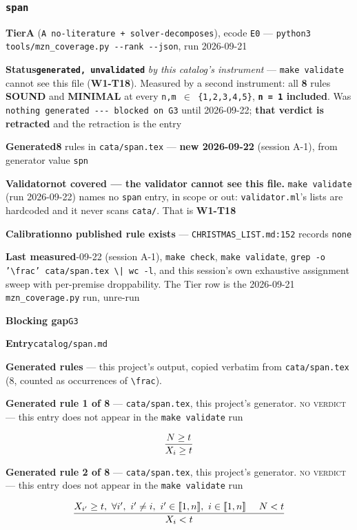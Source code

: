 \documentclass[10pt,a4paper]{article}
\newcommand{\entryfield}[2]{{\raggedright\textbf{#1}\quad #2\par}}
\newcommand{\rulebox}[1]{%
  \[\resizebox{\ifdim\width>\linewidth\linewidth\else\width\fi}{!}%
    {$\displaystyle #1$}\]}
\begin{document}
\subsubsection*{\texttt{span}}
\label{entry:span}
\entryfield{Tier}{\textbf{A} (\texttt{A no-\allowbreak{}literature + solver-\allowbreak{}decomposes}), ecode \texttt{E0} --- \texttt{python3 tools/\allowbreak{}mzn\_\allowbreak{}coverage.\allowbreak{}py -\allowbreak{}-\allowbreak{}rank -\allowbreak{}-\allowbreak{}json}, run 2026-09-21}
\entryfield{Status}{\textbf{\texttt{generated, unvalidated}} \emph{by this catalog's instrument} --- \texttt{make validate} cannot see this file (\textbf{W1-T18}). Measured by a second instrument: all \textbf{8} rules \textbf{SOUND} and \textbf{MINIMAL} at every \texttt{n,m $\in$ \{1,2,3,4,5\}}, \textbf{\texttt{n = 1} included}. Was \texttt{nothing generated -\allowbreak{}-\allowbreak{}-\allowbreak{} blocked on G3} until 2026-09-22; \textbf{that verdict is retracted} and the retraction is the entry}
\entryfield{Generated}{\textbf{8} rules in \texttt{cata/span.tex} --- \textbf{new 2026-09-22} (session A-1), from generator value \texttt{spn}}
\entryfield{Validator}{\textbf{not covered --- the validator cannot see this file.} \texttt{make validate} (run 2026-09-22) names no \texttt{span} entry, in scope or out: \texttt{validator.ml}'s lists are hardcoded and it never scans \texttt{cata/}. That is \textbf{W1-T18}}
\entryfield{Calibration}{\textbf{no published rule exists} --- \texttt{CHRISTMAS\_LIST.md:152} records \texttt{none}}
\entryfield{Last measured}{2026-09-22 (session A-1), \texttt{make check}, \texttt{make validate}, \texttt{grep -\allowbreak{}o '\textbackslash{}frac' cata/\allowbreak{}span.\allowbreak{}tex \textbackslash{}| wc -\allowbreak{}l}, and this session's own exhaustive assignment sweep with per-premise droppability. The Tier row is the 2026-09-21 \texttt{mzn\_coverage.py} run, unre-run}
\entryfield{Blocking gap}{\texttt{G3}}
\entryfield{Entry}{\texttt{catalog/span.md}}

\textbf{Generated rules} --- this project's output, copied verbatim from \texttt{cata/span.tex} (8, counted as occurrences of \texttt{\textbackslash{}frac}).\par

{\small\textbf{Generated rule 1 of 8} --- \texttt{cata/span.tex}, this project's generator. \textsc{no verdict} --- this entry does not appear in the \texttt{make validate} run\par}
\rulebox{\frac{N \geq t}{X_{i} \geq t}}

{\small\textbf{Generated rule 2 of 8} --- \texttt{cata/span.tex}, this project's generator. \textsc{no verdict} --- this entry does not appear in the \texttt{make validate} run\par}
\rulebox{\frac{X_{i'} \geq t,~\forall i',~i' \neq i,~i' \in \llbracket1,n\rrbracket,~i \in \llbracket1,n\rrbracket~~~~N<t}{X_{i}<t}}
\end{document}
